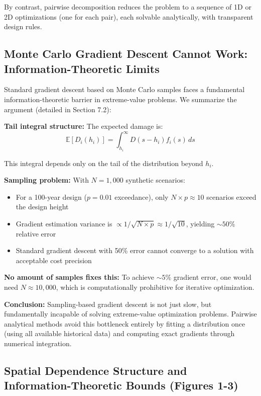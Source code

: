 \documentclass[review]{elsarticle}
\begin{document}
By contrast, pairwise decomposition reduces the problem to a sequence of 1D or 2D optimizations (one for each pair), each solvable analytically, with transparent design rules.

\subsection{Monte Carlo Gradient Descent Cannot Work: Information-Theoretic Limits}

Standard gradient descent based on Monte Carlo samples faces a fundamental information-theoretic barrier in extreme-value problems. We summarize the argument (detailed in Section 7.2):

\textbf{Tail integral structure:} The expected damage is:
\begin{equation}
\mathbb{E}[D_i(h_i)] = \int_{h_i}^\infty D(s-h_i) f_i(s) \, ds
\end{equation}

This integral depends only on the tail of the distribution beyond $h_i$.

\textbf{Sampling problem:} With $N = 1,000$ synthetic scenarios:
\begin{itemize}
\item For a 100-year design ($p = 0.01$ exceedance), only $N \times p \approx 10$ scenarios exceed the design height
\item Gradient estimation variance is $\propto 1/\sqrt{N \times p} \approx 1/\sqrt{10}$, yielding $\sim 50\%$ relative error
\item Standard gradient descent with 50\% error cannot converge to a solution with acceptable cost precision
\end{itemize}

\textbf{No amount of samples fixes this:} To achieve $\sim 5\%$ gradient error, one would need $N \approx 10,000$, which is computationally prohibitive for iterative optimization.

\textbf{Conclusion:} Sampling-based gradient descent is not just slow, but fundamentally incapable of solving extreme-value optimization problems. Pairwise analytical methods avoid this bottleneck entirely by fitting a distribution once (using all available historical data) and computing exact gradients through numerical integration.

\subsection{Spatial Dependence Structure and Information-Theoretic Bounds (Figures 1-3)}
\end{document}
